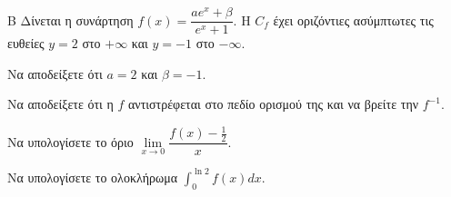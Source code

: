 \begin{thema}{Β}
Δίνεται η συνάρτηση $f(x) = \dfrac{a e^x + \beta}{e^x + 1}$. Η $C_f$ έχει οριζόντιες ασύμπτωτες τις ευθείες $y=2$ στο $+\infty$ και $y=-1$ στο $-\infty$.
\begin{erwthma}
  \item Να αποδείξετε ότι $a=2$ και $\beta=-1$.
  \item Να αποδείξετε ότι η $f$ αντιστρέφεται στο πεδίο ορισμού της και να βρείτε την $f^{-1}$.
  \item Να υπολογίσετε το όριο $\lim\limits_{x \to 0} \dfrac{f(x)-\frac{1}{2}}{x}$.
  \item Να υπολογίσετε το ολοκλήρωμα $\displaystyle\int_0^{\ln 2} f(x)dx$.
\end{erwthma}
\end{thema}
